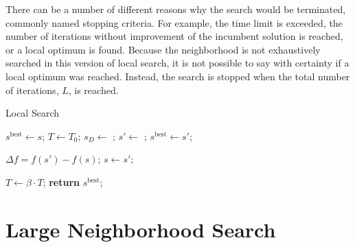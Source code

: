 There can be a number of different reasons why the search would be terminated, commonly named stopping criteria.
For example, the time limit is exceeded, the number of iterations without improvement of the incumbent solution is reached, or a local optimum is found.
Because the neighborhood is not exhaustively searched in this version of local search, it is not possible to say with certainty if a local optimum was reached.
Instead, the search is stopped when the total number of iterations, $L$, is reached.

\begin{algorithm}[tb]
    \caption{Local Search}
    \label{alg:localsearch}
    
    \newcommand{\Stemp}{s'}
    \newcommand{\Sbest}{s^{\mathrm{best}}}
    
    \begin{algorithmic}[1]
            \State $\Sbest \gets s$;
            \State $T \gets T_0$; \label{alg:localsearch-line-temp-init}
                \State $s_D \gets$ ; \label{alg:localsearch-line-destroy}
                \State $\Stemp \gets$ ; \label{alg:localsearch-line-repair}
                \If{$f(\Stemp) > f(\Sbest)$} \label{alg:localsearch-line-if-best}
                    \State $\Sbest \gets \Stemp$;
                \EndIf
                
                \State $\Delta f =  f(\Stemp) - f(s)$; \label{alg:localsearch-line-sa-start}
                 \label{alg:localsearch-line-sa-accept}
                    \State $s \gets \Stemp$;
                \EndIf
                
                \State $T \gets \beta \cdot T$; \label{alg:localsearch-line-sa-end}
            \EndFor
            \State \textbf{return} $\Sbest$;
        \EndProcedure
    \end{algorithmic}
\end{algorithm}


\section{Large Neighborhood Search}

